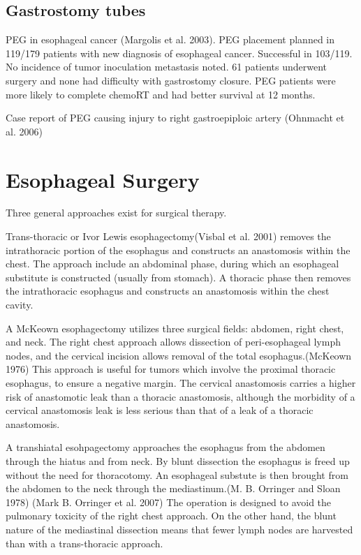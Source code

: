 \documentclass[
  letterpaper,
]{scrbook}
\begin{document}
\section{Gastrostomy tubes}\label{gastrostomy-tubes}

PEG in esophageal cancer (Margolis et al. 2003). PEG placement planned
in 119/179 patients with new diagnosis of esophageal cancer. Successful
in 103/119. No incidence of tumor inoculation metastasis noted. 61
patients underwent surgery and none had difficulty with gastrostomy
closure. PEG patients were more likely to complete chemoRT and had
better survival at 12 months.

Case report of PEG causing injury to right gastroepiploic artery
(Ohnmacht et al. 2006)

\chapter{Esophageal Surgery}\label{esophagectomy}

Three general approaches exist for surgical therapy.

Trans-thoracic or Ivor Lewis esophagectomy(Visbal et al. 2001) removes
the intrathoracic portion of the esophagus and constructs an anastomosis
within the chest. The approach include an abdominal phase, during which
an esophageal substitute is constructed (usually from stomach). A
thoracic phase then removes the intrathoracic esophagus and constructs
an anastomosis within the chest cavity.

A McKeown esophagectomy utilizes three surgical fields: abdomen, right
chest, and neck. The right chest approach allows dissection of
peri-esophageal lymph nodes, and the cervical incision allows removal of
the total esophagus.(McKeown 1976) This approach is useful for tumors
which involve the proximal thoracic esophagus, to ensure a negative
margin. The cervical anastomosis carries a higher risk of anastomotic
leak than a thoracic anastomosis, although the morbidity of a cervical
anastomosis leak is less serious than that of a leak of a thoracic
anastomosis.

A transhiatal esohpagectomy approaches the esophagus from the abdomen
through the hiatus and from neck. By blunt dissection the esophagus is
freed up without the need for thoracotomy. An esophageal substute is
then brought from the abdomen to the neck through the mediastinum.(M. B.
Orringer and Sloan 1978) (Mark B. Orringer et al. 2007) The operation is
designed to avoid the pulmonary toxicity of the right chest approach. On
the other hand, the blunt nature of the mediastinal dissection means
that fewer lymph nodes are harvested than with a trans-thoracic
approach.
\end{document}
